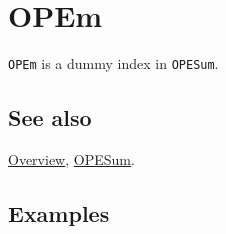 \documentclass[../FeynCalcManual.tex]{subfiles}
\begin{document}
\hypertarget{opem}{%
\section{OPEm}\label{opem}}

\texttt{OPEm} is a dummy index in \texttt{OPESum}.

\subsection{See also}

\hyperlink{toc}{Overview}, \hyperlink{opesum}{OPESum}.

\subsection{Examples}
\end{document}
